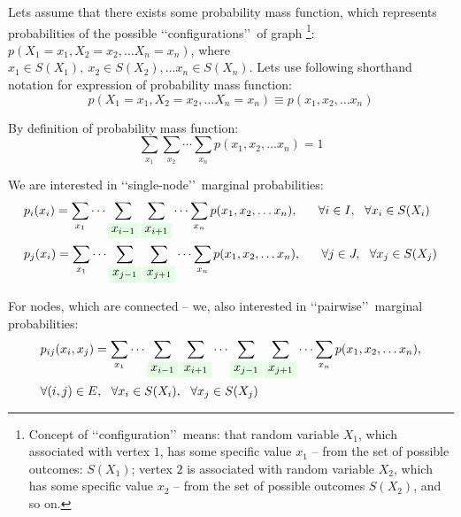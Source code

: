 \documentclass[fleqn,leqno]{article}
\newcommand{\highlight}[1]{\colorbox{green!10}{$\displaystyle#1$}}
\begin{document}
Lets assume that there exists some probability mass function, which represents probabilities of the possible \lq \lq configurations\rq \rq\ of graph \footnote{Concept of \lq \lq configuration\rq \rq\ means: that random variable $X_1$, which associated with vertex $1$, has some specific value $x_1$ -- from the set of possible outcomes: $S(X_1)$; vertex $2$ is associated with random variable $X_2$, which has some specific value $x_2$ -- from the set of possible outcomes $S(X_2)$, and so on.}: $p(X_1=x_1, X_2=x_2, \dots X_n=x_n)$, where $x_1 \in S(X_1),\ x_2 \in S(X_2),\dots x_n \in S(X_n)$. Lets use following shorthand notation for expression of probability mass function:
\begin{equation}
   p(X_1=x_1, X_2=x_2, \dots X_n=x_n) \equiv p(x_1, x_2, \dots x_n)
\end{equation}

By definition of probability mass function:
\begin{equation} \label{eq:probability_sum}
\sum_{x_1} \sum_{x_2} \cdots \sum_{x_n}  p(x_1, x_2, \dots x_n) = 1
\end{equation}

We are interested in \lq \lq single-node\rq \rq\ marginal probabilities:
\begin{equation} \label{eq:marginal_probabilities_one_node}
\begin{split}
   & p_i(x_i) = \sum_{x_1} \cdots \sum_{ \highlight{ x_{i - 1} } } \sum_{ \highlight{ x_{i + 1} } } \cdots \sum_{x_n} p(x_1, x_2, \dots x_n),\ \ \ \ \ \forall i \in I,\ \ \forall x_i \in S(X_i) \\
   & p_j(x_i) = \sum_{x_1} \cdots \sum_{ \highlight{ x_{j - 1} } } \sum_{ \highlight{ x_{j + 1} } } \cdots \sum_{x_n} p(x_1, x_2, \dots x_n),\ \ \ \ \ \forall j \in J,\ \ \forall x_j \in S(X_j) \\
\end{split}
\end{equation}

For nodes, which are connected -- we, also interested in \lq \lq pairwise\rq \rq\ marginal probabilities:
\begin{equation} \label{eq:marginal_probabilities_two_nodes}
\begin{split}
   & p_{ij}(x_i, x_j) = \sum_{x_1} \cdots \sum_{ \highlight{ x_{i - 1} } } \sum_{ \highlight{ x_{i + 1} } } \cdots \sum_{ \highlight{ x_{j - 1} } } \sum_{ \highlight{ x_{j + 1} } } \cdots \sum_{x_n} p(x_1, x_2, \dots x_n), \\
   & \forall (i, j) \in E,\ \ \forall x_i \in S(X_i),\ \ \forall x_j \in S(X_j)
\end{split}
\end{equation}
\end{document}
